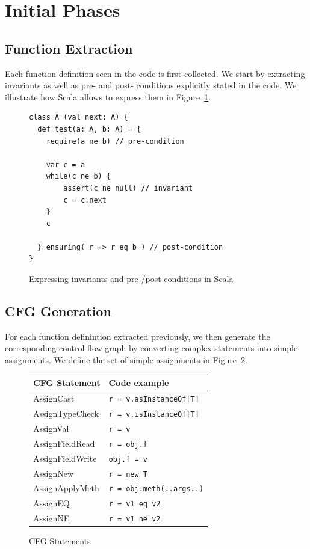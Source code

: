 \section{Initial Phases}
\subsection{Function Extraction}
Each function definition seen in the code is first collected. We start by
extracting invariants as well as pre- and post- conditions explicitly stated in
the code. We illustrate how Scala allows to express them in
Figure~\ref{fig:fe:example1}.

\begin{figure}[h]
    \centering
\begin{lstlisting}
class A (val next: A) {
  def test(a: A, b: A) = {
    require(a ne b) // pre-condition

    var c = a
    while(c ne b) {
        assert(c ne null) // invariant
        c = c.next
    }
    c

  } ensuring( r => r eq b ) // post-condition
}
\end{lstlisting}
    \caption{Expressing invariants and pre-/post-conditions in Scala}
    \label{fig:fe:example1}
\end{figure}

\subsection{CFG Generation}
For each function definintion extracted previously, we then generate the
corresponding control flow graph by converting complex statements into simple
assignments. We define the set of simple assignments in
Figure~\ref{fig:cfg:statements}.

\FloatBarrier
\begin{figure}[h]
    \centering

    \begin{tabular}{ l | l }
        CFG Statement               & Code example \\
        \hline
        AssignCast       & \verb/r = v.asInstanceOf[T]/  \\
        AssignTypeCheck  & \verb/r = v.isInstanceOf[T]/  \\
        AssignVal        & \verb/r = v/  \\
        AssignFieldRead  & \verb/r = obj.f/  \\
        AssignFieldWrite & \verb/obj.f = v/  \\
        AssignNew        & \verb/r = new T/  \\
        AssignApplyMeth  & \verb/r = obj.meth(..args..)/  \\
        AssignEQ         & \verb/r = v1 eq v2/  \\
        AssignNE         & \verb/r = v1 ne v2/  \\
    \end{tabular}

    \caption{CFG Statements}
    \label{fig:cfg:statements}
\end{figure}

